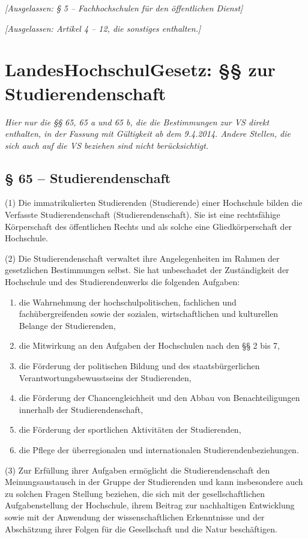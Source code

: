 \documentclass[
10pt,
a4paper,
twoside,								%
titlepage=false,							%
draft=false								%
]{scrartcl}
\begin{document}
\emph{[Ausgelassen: § 5 – Fachhochschulen für den öffentlichen Dienst]}


\bigskip
\emph{[Ausgelassen: Artikel 4 – 12, die sonstiges enthalten.]}




\newpage
\section{LandesHochschulGesetz: §§ zur Studierendenschaft}

\emph{Hier nur die §§ 65, 65 a und 65 b, die die Bestimmungen zur VS direkt enthalten, in der Fassung mit Gültigkeit ab dem 9.4.2014. Andere Stellen, die sich auch auf die VS beziehen sind nicht berücksichtigt.}


\subsection{§ 65 – Studierendenschaft}

(1) Die immatrikulierten Studierenden (Studierende) einer Hochschule bilden die Verfasste Studierendenschaft (Studierendenschaft). Sie ist eine rechtsfähige Körperschaft des öffentlichen Rechts und als solche eine Gliedkörperschaft der Hochschule.

(2) Die Studierendenschaft verwaltet ihre Angelegenheiten im Rahmen der gesetzlichen Bestimmungen selbst. Sie hat unbeschadet der Zuständigkeit der Hochschule und des
Studierendenwerks die folgenden Aufgaben:
\begin{enumerate}
	\item die Wahrnehmung der hochschulpolitischen, fachlichen und fachübergreifenden sowie der sozialen, wirtschaftlichen und kulturellen Belange der Studierenden,
	\item die Mitwirkung an den Aufgaben der Hochschulen nach den §§ 2 bis 7,
	\item die Förderung der politischen Bildung und des staatsbürgerlichen Verantwortungsbewusstseins der Studierenden,
	\item die Förderung der Chancengleichheit und den Abbau von Benachteiligungen innerhalb der Studierendenschaft,
	\item die Förderung der sportlichen Aktivitäten der Studierenden,
	\item die Pflege der überregionalen und internationalen Studierendenbeziehungen.
\end{enumerate}

(3) Zur Erfüllung ihrer Aufgaben ermöglicht die Studierendenschaft den Meinungsaustausch in der Gruppe der Studierenden und kann insbesondere auch zu solchen Fragen Stellung beziehen, die sich mit der gesellschaftlichen Aufgabenstellung der Hochschule, ihrem Beitrag zur nachhaltigen Entwicklung sowie mit der Anwendung der wissenschaftlichen Erkenntnisse und der Abschätzung ihrer Folgen für die Gesellschaft und die Natur beschäftigen.
\end{document}
